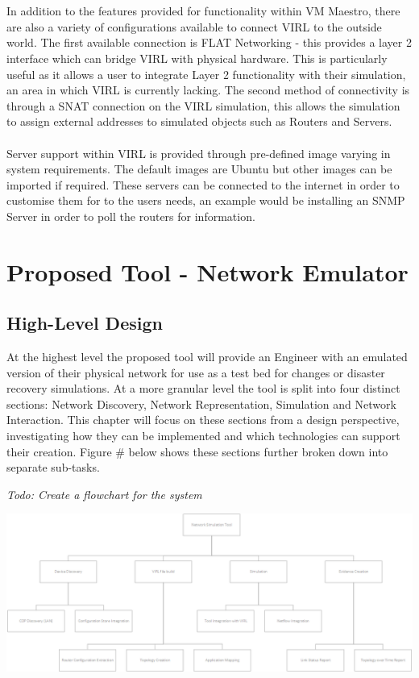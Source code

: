 \documentclass[11pt]{report}
\begin{document}
\\
\\
In addition to the features provided for functionality within VM Maestro, there are also a variety of configurations available to connect VIRL to the outside world. The first available connection is FLAT Networking - this provides a layer 2 interface which can bridge VIRL with physical hardware. This is particularly useful as it allows a user to integrate Layer 2 functionality with their simulation, an area in which VIRL is currently lacking. The second method of connectivity is through a SNAT connection on the VIRL simulation, this allows the simulation to assign external addresses to simulated objects such as Routers and Servers.
\\
\\
Server support within VIRL is provided through pre-defined image varying in system requirements. The default images are Ubuntu but other images can be imported if required. These servers can be connected to the internet in order to customise them for to the users needs, an example would be installing an SNMP Server in order to poll the routers for information.

\chapter{Proposed Tool - Network Emulator}

\section{High-Level Design}

At the highest level the proposed tool will provide an Engineer with an emulated version of their physical network for use as a test bed for changes or disaster recovery simulations. At a more granular level the tool is split into four distinct sections: Network Discovery, Network Representation, Simulation and Network Interaction. This chapter will focus on these sections from a design perspective, investigating how they can be implemented and which technologies can support their creation. Figure \# below shows these sections further broken down into separate sub-tasks.

\textit{Todo: Create a flowchart for the system}

\begin{center}
\includegraphics[width=1\textwidth]{Work-Breakdown.png}
\end{center}
\end{document}
